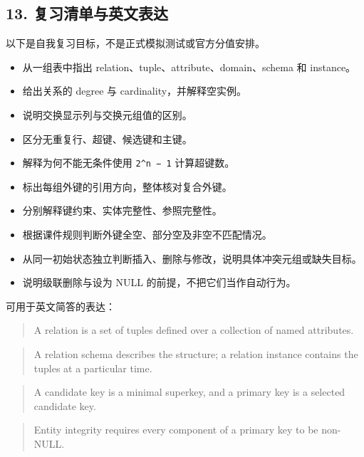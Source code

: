 \subsection{13. 复习清单与英文表达}\label{03_relational_model_and_integrity_zh-ux590dux4e60ux6e05ux5355ux4e0eux82f1ux6587ux8868ux8fbe}

以下是自我复习目标，不是正式模拟测试或官方分值安排。

\begin{itemize}
\tightlist
\item[$\square$]
  从一组表中指出 relation、tuple、attribute、domain、schema 和 instance。
\item[$\square$]
  给出关系的 degree 与 cardinality，并解释空实例。
\item[$\square$]
  说明交换显示列与交换元组值的区别。
\item[$\square$]
  区分无重复行、超键、候选键和主键。
\item[$\square$]
  解释为何不能无条件使用 \texttt{2\^{}n\ −\ 1} 计算超键数。
\item[$\square$]
  标出每组外键的引用方向，整体核对复合外键。
\item[$\square$]
  分别解释键约束、实体完整性、参照完整性。
\item[$\square$]
  根据课件规则判断外键全空、部分空及非空不匹配情况。
\item[$\square$]
  从同一初始状态独立判断插入、删除与修改，说明具体冲突元组或缺失目标。
\item[$\square$]
  说明级联删除与设为 NULL 的前提，不把它们当作自动行为。
\end{itemize}

可用于英文简答的表达：

\begin{quote}
A relation is a set of tuples defined over a collection of named attributes.
\end{quote}

\begin{quote}
A relation schema describes the structure; a relation instance contains the tuples at a particular time.
\end{quote}

\begin{quote}
A candidate key is a minimal superkey, and a primary key is a selected candidate key.
\end{quote}

\begin{quote}
Entity integrity requires every component of a primary key to be non-NULL.
\end{quote}

